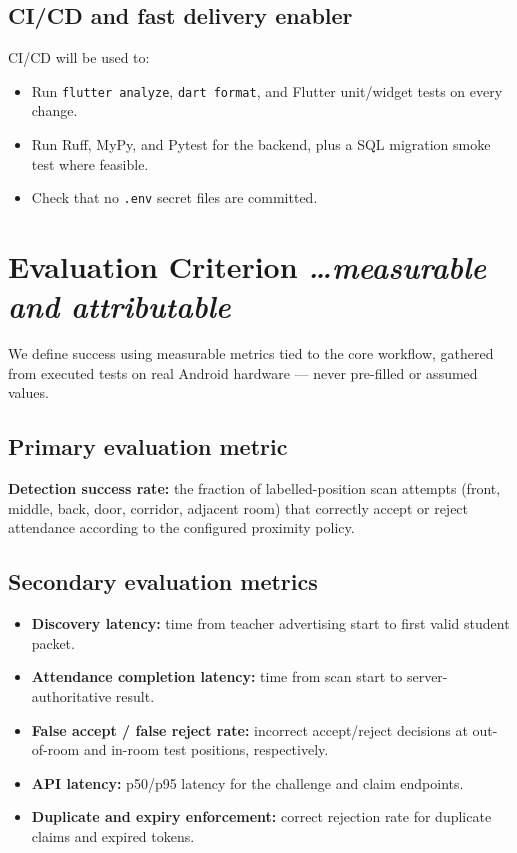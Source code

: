 \documentclass[11pt,a4paper]{article}
\newcommand{\BvrHint}[1]{%
  {\normalfont\normalsize\itshape\hfill #1}}
\begin{document}
\subsection{CI/CD and fast delivery enabler}
CI/CD will be used to:
\begin{itemize}[leftmargin=0.7cm]
    \item Run \texttt{flutter analyze}, \texttt{dart format}, and Flutter
    unit/widget tests on every change.
    \item Run Ruff, MyPy, and Pytest for the backend, plus a SQL
    migration smoke test where feasible.
    \item Check that no \texttt{.env} secret files are committed.
\end{itemize}

\section{Evaluation Criterion %
\BvrHint{\ldots measurable and attributable}}
We define success using measurable metrics tied to the core workflow,
gathered from executed tests on real Android hardware --- never
pre-filled or assumed values.

\subsection{Primary evaluation metric}
\textbf{Detection success rate:} the fraction of labelled-position scan
attempts (front, middle, back, door, corridor, adjacent room) that
correctly accept or reject attendance according to the configured
proximity policy.

\subsection{Secondary evaluation metrics}
\begin{itemize}[leftmargin=0.7cm]
    \item \textbf{Discovery latency:} time from teacher advertising start
    to first valid student packet.
    \item \textbf{Attendance completion latency:} time from scan start to
    server-authoritative result.
    \item \textbf{False accept / false reject rate:} incorrect
    accept/reject decisions at out-of-room and in-room test positions,
    respectively.
    \item \textbf{API latency:} p50/p95 latency for the challenge and
    claim endpoints.
    \item \textbf{Duplicate and expiry enforcement:} correct rejection
    rate for duplicate claims and expired tokens.
\end{itemize}
\end{document}
